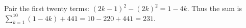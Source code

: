 Pair the first twenty terms: $(2k-1)^2-(2k)^2=1-4k$. Thus the sum is $\sum_{k=1}^{10}(1-4k)+441=10-220+441=\boxed{231}$.
